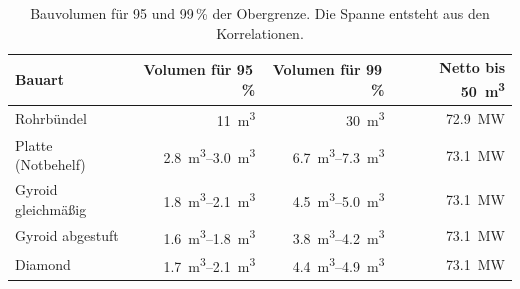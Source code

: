 \documentclass[10pt,a4paper]{article}
\begin{document}
\begin{table}[H]\centering\small
\begin{tabular}{lrrr}\toprule
Bauart & Volumen für 95\,\% & Volumen für 99\,\% & Netto bis \SI{50}{m^3}\\\midrule
Rohrbündel & \SI{11}{m^3} & \SI{30}{m^3} & \SI{72,9}{MW}\\
Platte (Notbehelf) & \SIrange{2,8}{3,0}{m^3} & \SIrange{6,7}{7,3}{m^3} & \SI{73,1}{MW}\\
Gyroid gleichmäßig & \SIrange{1,8}{2,1}{m^3} & \SIrange{4,5}{5,0}{m^3} & \SI{73,1}{MW}\\
Gyroid abgestuft & \SIrange{1,6}{1,8}{m^3} & \SIrange{3,8}{4,2}{m^3} & \SI{73,1}{MW}\\
Diamond & \SIrange{1,7}{2,1}{m^3} & \SIrange{4,4}{4,9}{m^3} & \SI{73,1}{MW}\\\bottomrule
\end{tabular}\caption{Bauvolumen für 95 und 99\,\% der Obergrenze. Die Spanne entsteht aus den Korrelationen.}\end{table}
\end{document}

